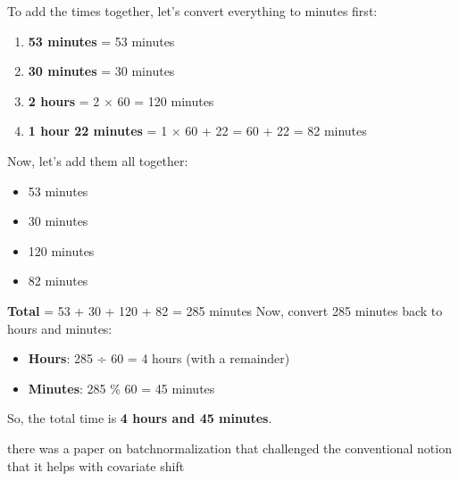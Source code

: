\begin{botresponse}

To add the times together, let's convert everything to minutes first:

\begin{enumerate}
\item \textbf{53 minutes} = 53 minutes
\item \textbf{30 minutes} = 30 minutes
\item \textbf{2 hours} = 2 × 60 = 120 minutes
\item \textbf{1 hour 22 minutes} = 1 × 60 + 22 = 60 + 22 = 82 minutes
\end{enumerate}

Now, let's add them all together:

\begin{itemize}
\item 53 minutes
\item 30 minutes
\item 120 minutes
\item 82 minutes
\end{itemize}

\textbf{Total} = 53 + 30 + 120 + 82 = 285 minutes
Now, convert 285 minutes back to hours and minutes:

\begin{itemize}
\item \textbf{Hours}: 285 ÷ 60 = 4 hours (with a remainder)
\item \textbf{Minutes}: 285 \% 60 = 45 minutes
\end{itemize}

So, the total time is \textbf{4 hours and 45 minutes}.

\end{botresponse}

\begin{userprompt}

there was a paper on batchnormalization that challenged the conventional notion that it helps with covariate shift

\end{userprompt}

